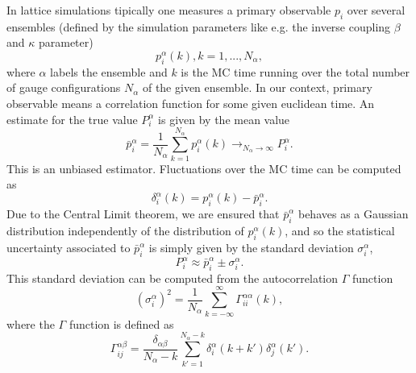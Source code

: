 In lattice simulations tipically one measures a primary observable $p_i$ over several ensembles (defined by the simulation parameters like e.g. the inverse coupling $\beta$ and $\kappa$ parameter) 
\begin{equation}
p_i^{\alpha}(k), k=1,...,N_{\alpha},
\end{equation}
where $\alpha$ labels the ensemble and $k$ is the MC time running over the total number of gauge configurations $N_{\alpha}$ of the given ensemble. In our context, primary observable means a correlation function for some given euclidean time. An estimate for the true value $P_i^{\alpha}$ is given by the mean value
\begin{equation}
\bar{p}_i^{\alpha}=\frac{1}{N_{\alpha}}\sum_{k=1}^{N_{\alpha}}p_i^{\alpha}(k)\rightarrow_{N_{\alpha}\rightarrow\infty}P_i^{\alpha}.
\end{equation}
This is an unbiased estimator. Fluctuations over the MC time can be computed as
\begin{equation}
\delta_i^{\alpha}(k)=p_i^{\alpha}(k)-\bar{p}_i^{\alpha}.
\end{equation}
Due to the Central Limit theorem, we are ensured that $\bar{p}_i^{\alpha}$ behaves as a Gaussian distribution independently of the distribution of $p_i^{\alpha}(k)$, and so the statistical uncertainty associated to $\bar{p}_i^{\alpha}$ is simply given by the standard deviation $\sigma_i^{\alpha}$,
\begin{equation}
P_i^{\alpha}\approx\bar{p}_i^{\alpha}\pm\sigma_i^{\alpha}.
\end{equation}
This standard deviation can be computed from the autocorrelation $\Gamma$ function
\begin{equation}
(\sigma_i^{\alpha})^2=\frac{1}{N_{\alpha}}\sum_{k=-\infty}^{\infty}\Gamma_{ii}^{\alpha\alpha}(k),
\end{equation}
where the $\Gamma$ function is defined as
\begin{equation}
\Gamma_{ij}^{\alpha\beta}=\frac{\delta_{\alpha\beta}}{N_{\alpha}-k}\sum_{k'=1}^{N_{\alpha}-k}\delta_i^{\alpha}(k+k')\delta_j^{\alpha}(k').
\end{equation}

